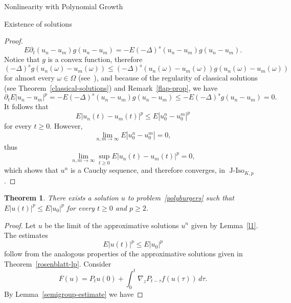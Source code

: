 \documentclass[a4paper,10pt,fleqn]{amsart}
\newtheorem{theorem}{Theorem}[section]
\theoremstyle{remark}
\theoremstyle{definition}
\DeclareMathOperator{\JIso}{J-Iso}
\newcommand{\dt} {\partial_t}
\newcommand{\grad} {\nabla_{\!z}}
\renewcommand{\=} {\overset{d}{=}}
\newcommand{\fLap} {(-\Delta)^s}
\begin{document}
\begin{section}{Nonlinearity with Polynomial Growth}
\begin{subsection}{Existence of solutions}
\begin{proof}
\begin{equation*}
            E\dt(u_n-u_m) g(u_n-u_m) = -E\fLap (u_n-u_m)g(u_n-u_m).
	\end{equation*}
	Notice that $g$ is a convex function, therefore
	\begin{equation*}
	 \fLap g(u_n(\omega)-u_m(\omega))\leq\fLap (u_n(\omega)-u_m(\omega))g(u_n(\omega)-u_m(\omega)) 
	\end{equation*}
	for almost every $\omega\in\Omega$ (see~\cite[Theorem 1.1]{MR3642734}), 
	and because of the regularity of classical solutions
	(see Theorem~\ref{classical-solutions}) and Remark~\ref{flap-prop}, we have
	\begin{equation*}
            \dt E|u_n-u_m|^p = -E\fLap (u_n-u_m)g(u_n-u_m) \leq -E\fLap g(u_n-u_m)=0.
	\end{equation*}
        It follows that
        \begin{equation*}
            E|u_n(t)-u_m(t)|^p \leq E|u_0^n-u_0^m|^p
        \end{equation*}
        for every $t\geq 0$. However, 
        \begin{equation*}
            \lim_{n,m\to\infty} E|u_0^n-u_0^m| = 0,
        \end{equation*}
        thus 
        \begin{equation*}
         \lim_{n,m\to\infty} \sup_{t\geq0} E|u_n(t)-u_m(t)|^p = 0,
        \end{equation*}
        which shows that $u^n$ is a Cauchy sequence, and therefore converges, in $\JIso_{K,p}$.
    \end{proof}
    \begin{theorem}\label{main}
        There exists 
        a solution $u$ to problem~\eqref{polyburgers} such that $E|u(t)|^p\leq E|u_0|^p$ for every $t\geq0$ and $p\geq2$.
    \end{theorem}
    \begin{proof}
        Let $u$ be the limit of the approximative solutions $u^n$ given by Lemma~\ref{l1}.
         The estimates 
         \begin{equation}\label{yet-another-estimate}
          E|u(t)|^p\leq E|u_0|^p
         \end{equation}
         follow from the analogous properties of the
         approximative solutions given in Theorem~\ref{rosenblatt-lp}.
          Consider
          \begin{equation*}
           F(u) = P_{t}u(0) + \int_0^{t} \grad P_{t-\tau} f(u(\tau))\,d\tau.
          \end{equation*}
          By Lemma~\ref{semigroup-estimate} we have

\end{proof}
\end{subsection}
\end{section}
\end{document}

